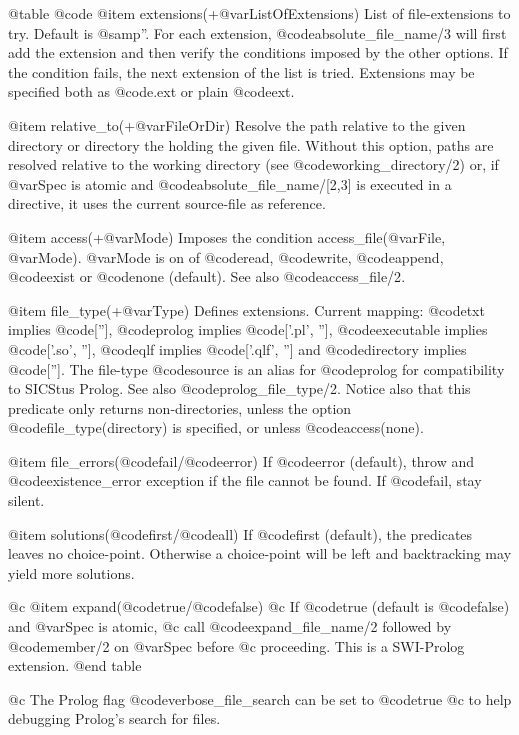 {{{{{@table @code
    @item extensions(+@var{ListOfExtensions})
List of file-extensions to try.  Default is @samp{''}.  For each
extension, @code{absolute_file_name/3} will first add the extension and then
verify the conditions imposed by the other options.  If the condition
fails, the next extension of the list is tried.  Extensions may be
specified both as @code{.ext} or plain @code{ext}.

    @item relative_to(+@var{FileOrDir})
Resolve the path relative to the given directory or directory the
holding the given file.  Without this option, paths are resolved
relative to the working directory (see @code{working_directory/2}) or,
if @var{Spec} is atomic and @code{absolute_file_name/[2,3]} is executed
in a directive, it uses the current source-file as reference.

    @item access(+@var{Mode})
Imposes the condition access_file(@var{File}, @var{Mode}).  @var{Mode}
is on of @code{read}, @code{write}, @code{append}, @code{exist} or
@code{none} (default). 
See also @code{access_file/2}.

    @item file_type(+@var{Type})
Defines extensions. Current mapping: @code{txt} implies @code{['']},
@code{prolog} implies @code{['.pl', '']}, @code{executable} implies
@code{['.so', '']}, @code{qlf} implies @code{['.qlf', '']} and
@code{directory} implies @code{['']}.  The file-type @code{source}
is an alias for @code{prolog} for compatibility to SICStus Prolog.
See also @code{prolog_file_type/2}. Notice also that this predicate only
returns non-directories, unless the option @code{file_type(directory)} is
specified, or unless @code{access(none)}.

    @item file_errors(@code{fail}/@code{error})
If @code{error} (default), throw and @code{existence_error} exception
if the file cannot be found.  If @code{fail}, stay silent.

    @item solutions(@code{first}/@code{all})
If @code{first} (default), the predicates leaves no choice-point.
Otherwise a choice-point will be left and backtracking may yield
more solutions.

@c     @item expand(@code{true}/@code{false})
@c If @code{true} (default is @code{false}) and @var{Spec} is atomic,
@c call @code{expand_file_name/2} followed by @code{member/2} on @var{Spec} before
@c proceeding.  This is a SWI-Prolog extension.
@end table

@c The Prolog flag @code{verbose_file_search} can be set to @code{true}
@c to help debugging Prolog's search for files.

}}}}}

